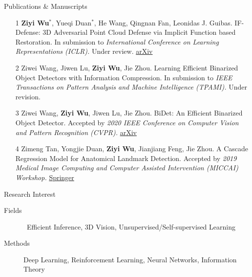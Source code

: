 \documentclass{resume} %
\begin{document}
\begin{rSection}{Publications \& Manuscripts}

\begin{enumerate}
\item[1] \textbf{Ziyi Wu}$^{*}$, Yueqi Duan$^{*}$, He Wang, Qingnan Fan, Leonidas J. Guibas. IF-Defense: 3D Adversarial Point Cloud Defense via Implicit Function based Restoration. In submission to \textit{International Conference on Learning Representations (ICLR).} Under review. \href{https://arxiv.org/abs/2010.05272}{arXiv}
\item[2] Ziwei Wang, Jiwen Lu, \textbf{Ziyi Wu}, Jie Zhou. Learning Efficient Binarized Object Detectors with Information Compression. In submission to \textit{IEEE Transactions on Pattern Analysis and Machine Intelligence (TPAMI).} Under revision.
\item[3] Ziwei Wang, \textbf{Ziyi Wu}, Jiwen Lu, Jie Zhou. BiDet: An Efficient Binarized Object Detector. Accepted by \textit{2020 IEEE Conference on Computer Vision and Pattern Recognition (CVPR).} \href{https://arxiv.org/abs/2003.03961}{arXiv}
\item[4] Zimeng Tan, Yongjie Duan, \textbf{Ziyi Wu}, Jianjiang Feng, Jie Zhou. A Cascade Regression Model for Anatomical Landmark Detection. Accepted by \textit{2019 Medical Image Computing and Computer Assisted Intervention (MICCAI) Workshop.} \href{https://link.springer.com/chapter/10.1007/978-3-030-39074-7_5}{Springer}
\end{enumerate}

\end{rSection}

\begin{rSection}{Research Interest}

\begin{description}
    \item[Fields] \quad\quad\, 
    Efficient Inference, 
    3D Vision, %
    Unsupervised/Self-supervised Learning
    \item[Methods] \quad Deep Learning, Reinforcement Learning, Neural Networks, Information Theory
    \newline
\end{description}

\end{rSection}
\end{document}

